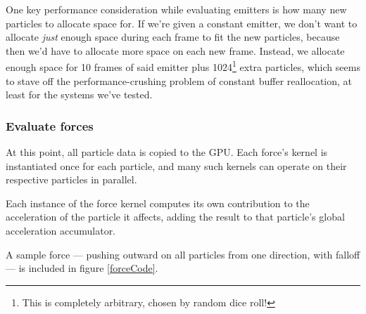\documentclass{acmsiggraph}
\begin{document}
One key performance consideration while evaluating emitters is how many new particles to allocate space for. If we're given a constant emitter, we don't want to allocate {\it just} enough space during each frame to fit the new particles, because then we'd have to allocate more space on each new frame. Instead, we allocate enough space for 10 frames of said emitter plus 1024\footnote{This is completely arbitrary, chosen by random dice roll!} extra particles, which seems to stave off the performance-crushing problem of constant buffer reallocation, at least for the systems we've tested.

\subsubsection{Evaluate forces}

At this point, all particle data is copied to the GPU. Each force's kernel is instantiated once for each particle, and many such kernels can operate on their respective particles in parallel.

Each instance of the force kernel computes its own contribution to the acceleration of the particle it affects, adding the result to that particle's global acceleration accumulator.

A sample force --- pushing outward on all particles from one direction, with falloff --- is included in figure \ref{forceCode}.
\end{document}
